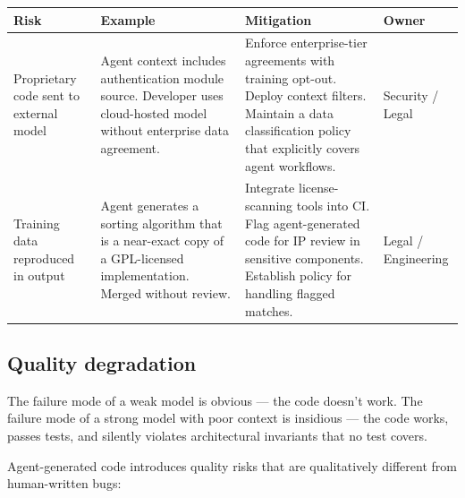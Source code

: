 \documentclass[
  a4paper,
  DIV=11,
  numbers=noendperiod]{scrreprt}
\newcounter{none} %
\begin{document}
{\def\LTcaptype{none} %
\begin{longtable}[]{@{}
  >{\raggedright\arraybackslash}p{}
  >{\raggedright\arraybackslash}p{}
  >{\raggedright\arraybackslash}p{}
  >{\raggedright\arraybackslash}p{}@{}}
\toprule\noalign{}
\begin{minipage}[b]{\linewidth}\raggedright
Risk
\end{minipage} & \begin{minipage}[b]{\linewidth}\raggedright
Example
\end{minipage} & \begin{minipage}[b]{\linewidth}\raggedright
Mitigation
\end{minipage} & \begin{minipage}[b]{\linewidth}\raggedright
Owner
\end{minipage} \\
\midrule\noalign{}
\endhead
\bottomrule\noalign{}
\endlastfoot
Proprietary code sent to external model & Agent context includes
authentication module source. Developer uses cloud-hosted model without
enterprise data agreement. & Enforce enterprise-tier agreements with
training opt-out. Deploy context filters. Maintain a data classification
policy that explicitly covers agent workflows. & Security / Legal \\
Training data reproduced in output & Agent generates a sorting algorithm
that is a near-exact copy of a GPL-licensed implementation. Merged
without review. & Integrate license-scanning tools into CI. Flag
agent-generated code for IP review in sensitive components. Establish
policy for handling flagged matches. & Legal / Engineering \\
\end{longtable}
}

\subsection{Quality degradation}\label{quality-degradation}

The failure mode of a weak model is obvious --- the code doesn't work.
The failure mode of a strong model with poor context is insidious ---
the code works, passes tests, and silently violates architectural
invariants that no test covers.

Agent-generated code introduces quality risks that are qualitatively
different from human-written bugs:
\end{document}
